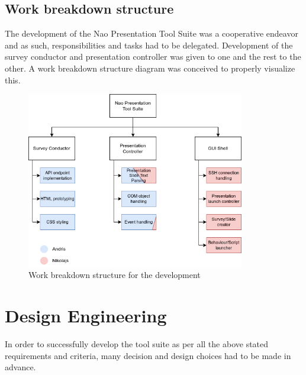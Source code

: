 \documentclass[12pt, fleqn, a4paper]{article}
\begin{document}
\subsection{Work breakdown structure}
The development of the Nao Presentation Tool Suite was a cooperative endeavor and as such, responsibilities and tasks had to be delegated. Development of the survey conductor and presentation controller was given to one and the rest to the other. A work breakdown structure diagram was conceived to properly visualize this.
\begin{figure}[H]
	\centering
	\includegraphics[width=0.85\textwidth]{img/wbs.png}
	\caption{Work breakdown structure for the development}
\end{figure}

\section{Design Engineering} %
In order to successfully develop the tool suite as per all the above stated requirements and criteria, many decision and design choices had to be made in advance.
\end{document}
